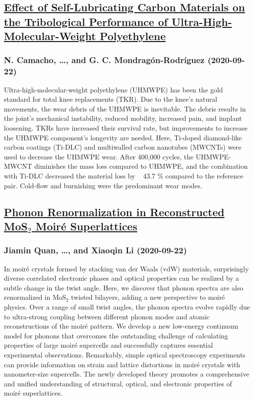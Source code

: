 {\subsection*{\href{http://arxiv.org/abs/2009.10659v1}{Effect of Self-Lubricating Carbon Materials on the Tribological  Performance of Ultra-High-Molecular-Weight Polyethylene}}
\subsubsection*{N. Camacho, \dots, and G. C. Mondragón-Rodríguez (2020-09-22)}
Ultra-high-molecular-weight polyethylene (UHMWPE) has been the gold standard
for total knee replacements (TKR). Due to the knee's natural movements, the
wear debris of the UHMWPE is inevitable. The debris results in the joint's
mechanical instability, reduced mobility, increased pain, and implant
loosening. TKRs have increased their survival rate, but improvements to
increase the UHMWPE component's longevity are needed. Here, Ti-doped
diamond-like carbon coatings (Ti-DLC) and multiwalled carbon nanotubes (MWCNTs)
were used to decrease the UHMWPE wear. After 400,000 cycles, the UHMWPE-MWCNT
diminishes the mass loss compared to UHMWPE, and the combination with Ti-DLC
decreased the material loss by ~ 43.7 \% compared to the reference pair.
Cold-flow and burnishing were the predominant wear modes.

\subsection*{\href{http://arxiv.org/abs/2009.10650v1}{Phonon Renormalization in Reconstructed MoS$_2$ Moiré Superlattices}}
\subsubsection*{Jiamin Quan, \dots, and Xiaoqin Li (2020-09-22)}
In moir\'e crystals formed by stacking van der Waals (vdW) materials,
surprisingly diverse correlated electronic phases and optical properties can be
realized by a subtle change in the twist angle. Here, we discover that phonon
spectra are also renormalized in MoS$_2$ twisted bilayers, adding a new
perspective to moir\'e physics. Over a range of small twist angles, the phonon
spectra evolve rapidly due to ultra-strong coupling between different phonon
modes and atomic reconstructions of the moir\'e pattern. We develop a new
low-energy continuum model for phonons that overcomes the outstanding challenge
of calculating properties of large moir\'e supercells and successfully captures
essential experimental observations. Remarkably, simple optical spectroscopy
experiments can provide information on strain and lattice distortions in
moir\'e crystals with nanometer-size supercells. The newly developed theory
promotes a comprehensive and unified understanding of structural, optical, and
electronic properties of moir\'e superlattices.

}
